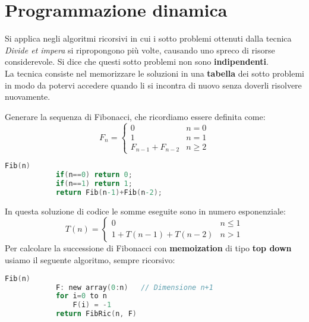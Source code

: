 \newpage
\section{Programmazione dinamica}
Si applica negli algoritmi ricorsivi in cui i sotto problemi ottenuti dalla tecnica \emph{Divide et impera} si ripropongono più volte, causando uno spreco di risorse considerevole. Si dice che questi sotto problemi non sono \textbf{indipendenti}. \\
La tecnica consiste nel memorizzare le soluzioni in una \textbf{tabella} dei sotto problemi in modo da potervi accedere quando li si incontra di nuovo senza doverli risolvere nuovamente.
\begin{example}[Fibonacci]
	Generare la sequenza di Fibonacci, che ricordiamo essere definita come:
	\begin{equation*}
		F_n = 
		\begin{cases}
			0 & n=0 \\
			1 & n=1 \\
			F_{n-1} + F_{n-2} & n \geq 2
		\end{cases}
	\end{equation*}
	\begin{lstlisting}[language=C, caption=Fibonacci, mathescape=true]
		Fib(n)
			if(n==0) return 0;
			if(n==1) return 1;
			return Fib(n-1)+Fib(n-2);
	\end{lstlisting}
	In questa soluzione di codice le somme eseguite sono in numero esponenziale:
	\begin{equation*}
		T(n) = 
		\begin{cases}
			0 & n \leq 1 \\
			1 + T(n-1) + T(n-2) & n > 1
		\end{cases}
	\end{equation*}
	Per calcolare la successione di Fibonacci con \textbf{memoization} di tipo \textbf{top down} usiamo il seguente algoritmo, sempre ricorsivo:
	 \begin{lstlisting}[language=C, caption=Fibonacci dinamico top-down, mathescape=true]
	 	Fib(n)
	 		F: new array(0:n)	// Dimensione n+1
	 		for i=0 to n
	 			F(i) = -1
	 		return FibRic(n, F)
	 	

\end{lstlisting}
\end{example}
